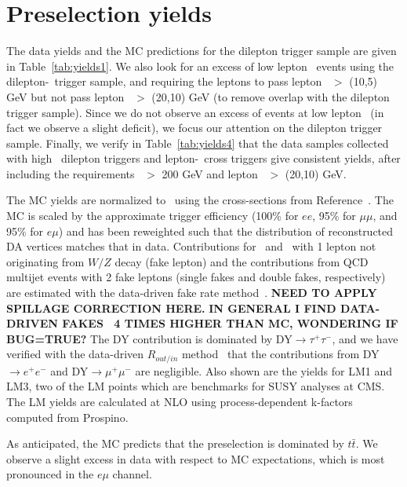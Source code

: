 \section{Preselection yields}
\label{sec:yields}

The data yields and the MC predictions for the dilepton trigger sample are given in Table~\ref{tab:yields1}.
We also look for an excess of low lepton \pt\ events using the dilepton-\Ht\ trigger sample, and
requiring the leptons to pass lepton \pt\ $>$ (10,5) GeV but not pass lepton \pt\ $>$ (20,10) GeV
(to remove overlap with the dilepton trigger sample). Since we do not observe an excess of
events at low lepton \pt\ (in fact we observe a slight deficit), we focus our attention on the dilepton trigger sample.
Finally, we verify in Table~\ref{tab:yields4} that the data samples collected with high \pt\ dilepton
triggers and lepton-\Ht\ cross triggers give consistent yields, after including the requirements
\Ht\ $>$ 200 GeV and lepton \pt\ $>$ (20,10) GeV.

The MC yields are normalized to \lumi\ using the cross-sections
from Reference~\cite{ref:xsec}. The MC is scaled by the approximate trigger efficiency (100\% for $ee$,
95\% for $\mu\mu$, and 95\% for $e\mu$) and has been reweighted such that the distribution of 
reconstructed DA vertices matches that in data. Contributions for \ttfake\ and \wjets\  
with 1 lepton not originating from $W/Z$ decay (fake lepton) and the contributions from QCD multijet events 
with 2 fake leptons (single fakes and double fakes, respectively) are estimated with the data-driven
fake rate method~\cite{ref:top}. 
{\color{red} \bf NEED TO APPLY SPILLAGE CORRECTION HERE.}
{\bf IN GENERAL I FIND DATA-DRIVEN FAKES ~4 TIMES HIGHER THAN MC, WONDERING IF BUG=TRUE?}
The DY contribution is dominated by DY$\rightarrow \tau^+\tau^-$,
and we have verified with the data-driven $R_{out/in}$ method~\cite{ref:top} that the
contributions from DY$\to e^{+}e^{-}$ and DY$\to \mu^{+}\mu^{-}$ are negligible.
Also shown are the yields for LM1 and LM3, two of the LM 
points which are benchmarks for SUSY analyses at CMS. The LM yields
are calculated at NLO using process-dependent k-factors computed from Prospino.

As anticipated, the MC predicts that the preselection is dominated by $t\bar{t}$.  
We observe a slight excess in data with respect to MC expectations, which is most pronounced in the $e\mu$ channel.

